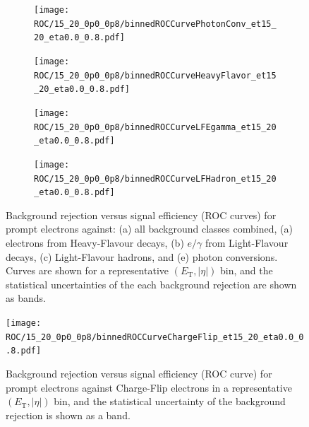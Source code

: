\begin{figure}[h]
  \centering
  \begin{subfigure}[t]{0.5\linewidth}
    \centering
    \texttt{[image: ROC/15\_20\_0p0\_0p8/binnedROCCurvePhotonConv\_et15\_20\_eta0.0\_0.8.pdf]}
    \caption{}
    \label{fig:roc_pc}
  \end{subfigure}\hfill
  \begin{subfigure}[t]{0.5\linewidth}
    \centering
    \texttt{[image: ROC/15\_20\_0p0\_0p8/binnedROCCurveHeavyFlavor\_et15\_20\_eta0.0\_0.8.pdf]}
    \caption{}
    \label{fig:roc_hf}
  \end{subfigure}

  \vspace{0.35cm}

  \begin{subfigure}[t]{0.5\linewidth}
    \centering
    \texttt{[image: ROC/15\_20\_0p0\_0p8/binnedROCCurveLFEgamma\_et15\_20\_eta0.0\_0.8.pdf]}
    \caption{}
    \label{fig:roc_lfeg}
  \end{subfigure}\hfill
  \begin{subfigure}[t]{0.5\linewidth}
    \centering
    \texttt{[image: ROC/15\_20\_0p0\_0p8/binnedROCCurveLFHadron\_et15\_20\_eta0.0\_0.8.pdf]}
    \caption{}
    \label{fig:roc_lfh}
  \end{subfigure}

  \caption{Background rejection versus signal efficiency (ROC curves) for prompt electrons against:
  (a) all background classes combined,
  (a) electrons from Heavy-Flavour decays,
  (b) $e/\gamma$ from Light-Flavour decays,
  (c) Light-Flavour hadrons,
  and (e) photon conversions.
  Curves are shown for a representative $(E_{\text{T}}, |\eta|)$ bin, and the statistical uncertainties of the each background rejection are shown as bands.}
  \label{fig:roc_mainbkg}
\end{figure}


\begin{figure}[h]
  \centering
  \texttt{[image: ROC/15\_20\_0p0\_0p8/binnedROCCurveChargeFlip\_et15\_20\_eta0.0\_0.8.pdf]}
  \caption{Background rejection versus signal efficiency (ROC curve) for prompt electrons against Charge-Flip electrons in a representative $(E_{\text{T}}, |\eta|)$ bin, and the statistical uncertainty of the background rejection is shown as a band.}
  \label{fig:roc_cf}
\end{figure}

\FloatBarrier
